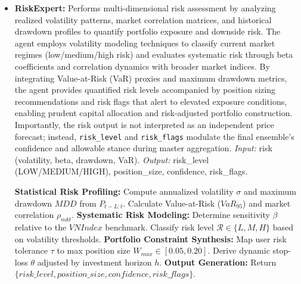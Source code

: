 \documentclass{ieeeaccess}
\begin{document}
\begin{itemize}
    \item \textbf{RiskExpert:} 
    Performs multi-dimensional risk assessment by analyzing realized volatility patterns, market correlation matrices, and historical drawdown profiles to quantify portfolio exposure and downside risk. The agent employs volatility modeling techniques to classify current market regimes (low/medium/high risk) and evaluates systematic risk through beta coefficients and correlation dynamics with broader market indices. By integrating Value-at-Risk (VaR) proxies and maximum drawdown metrics, the agent provides quantified risk levels accompanied by position sizing recommendations and risk flags that alert to elevated exposure conditions, enabling prudent capital allocation and risk-adjusted portfolio construction.  
    Importantly, the risk output is not interpreted as an independent price forecast; instead, \texttt{risk\_level} and \texttt{risk\_flags} modulate the final ensemble's confidence and allowable stance during master aggregation.
    \textit{Input:} risk (volatility, beta, drawdown, VaR).  
    \textit{Output:} risk\_level (LOW/MEDIUM/HIGH), position\_size, confidence, risk\_flags.

    \begin{breakablealgorithm}
    \caption{RiskExpert multi-dimensional assessment}
    \begin{algorithmic}[1]
    \STATE \textbf{Statistical Risk Profiling:}
    \STATE \quad Compute annualized volatility $\sigma$ and maximum drawdown $MDD$ from $P_{t-L:t}$.
    \STATE \quad Calculate Value-at-Risk ($VaR_{95}$) and market correlation $\rho_{mkt}$.
    \STATE \textbf{Systematic Risk Modeling:}
    \STATE \quad Determine sensitivity $\beta$ relative to the $VNIndex$ benchmark.
    \STATE \quad Classify risk level $\mathcal{R} \in \{L, M, H\}$ based on volatility thresholds.
    \STATE \textbf{Portfolio Constraint Synthesis:}
    \STATE \quad Map user risk tolerance $\tau$ to max position size $W_{max} \in [0.05, 0.20]$.
    \STATE \quad Derive dynamic stop-loss $\theta$ adjusted by investment horizon $h$.
    \STATE \textbf{Output Generation:}
    \STATE \quad Return $\{risk\_level, position\_size, confidence, risk\_flags\}$.
    \end{algorithmic}
    \end{breakablealgorithm}


\end{itemize}
\end{document}
